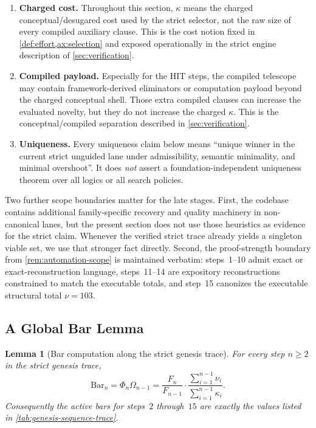 \documentclass[11pt,a4paper]{article}
\theoremstyle{plain}
\newtheorem{lemma}[theorem]{Lemma}
\theoremstyle{definition}
\theoremstyle{remark}
\begin{document}
\begin{enumerate}[nosep]
    \item \textbf{Charged cost.} Throughout this section, $\kappa$ means the
    charged conceptual/desugared cost used by the strict selector, not the raw
    size of every compiled auxiliary clause.
    This is the cost notion fixed in \cref{def:effort,ax:selection} and exposed
    operationally in the strict engine description of
    \cref{sec:verification}.
    \item \textbf{Compiled payload.} Especially for the HIT steps, the compiled
    telescope may contain framework-derived eliminators or computation payload
    beyond the charged conceptual shell.
    Those extra compiled clauses can increase the evaluated novelty, but they do
    not increase the charged $\kappa$.
    This is the conceptual/compiled separation described in
    \cref{sec:verification}.
    \item \textbf{Uniqueness.} Every uniqueness claim below means
    ``unique winner in the current strict unguided lane under admissibility,
    semantic minimality, and minimal overshoot''.
    It does \emph{not} assert a foundation-independent uniqueness theorem over
    all logics or all search policies.
\end{enumerate}

Two further scope boundaries matter for the late stages.
First, the codebase contains additional family-specific recovery and quality
machinery in non-canonical lanes, but the present section does not use those
heuristics as evidence for the strict claim.
Whenever the verified strict trace already yields a singleton viable set, we use
that stronger fact directly.
Second, the proof-strength boundary from \cref{rem:automation-scope} is
maintained verbatim:
steps~1--10 admit exact or exact-reconstruction language,
steps~11--14 are expository reconstructions constrained to match the executable
totals, and step~15 canonizes the executable structural total $\nu=103$.

\subsection{A Global Bar Lemma}
\label{subsec:genesis-bar-lemma}

\begin{lemma}[Bar computation along the strict genesis trace]
\label{lem:genesis-bar-lemma}
For every step $n \ge 2$ in the strict genesis trace,
\[
  \mathrm{Bar}_n
  =
  \Phi_n \Omega_{n-1}
  =
  \frac{F_n}{F_{n-1}}
  \cdot
  \frac{\sum_{i=1}^{n-1}\nu_i}{\sum_{i=1}^{n-1}\kappa_i}.
\]
Consequently the active bars for steps~$2$ through~$15$ are exactly the values
listed in \cref{tab:genesis-sequence-trace}.
\end{lemma}
\end{document}
